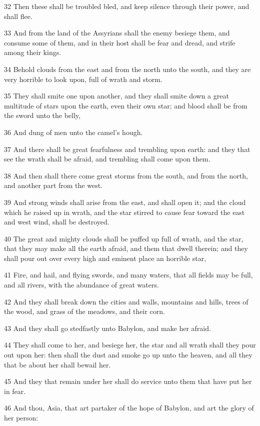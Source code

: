 \par 32 Then these shall be troubled bled, and keep silence through their power, and shall flee.
\par 33 And from the land of the Assyrians shall the enemy besiege them, and consume some of them, and in their host shall be fear and dread, and strife among their kings.
\par 34 Behold clouds from the east and from the north unto the south, and they are very horrible to look upon, full of wrath and storm.
\par 35 They shall smite one upon another, and they shall smite down a great multitude of stars upon the earth, even their own star; and blood shall be from the sword unto the belly,
\par 36 And dung of men unto the camel's hough.
\par 37 And there shall be great fearfulness and trembling upon earth: and they that see the wrath shall be afraid, and trembling shall come upon them.
\par 38 And then shall there come great storms from the south, and from the north, and another part from the west.
\par 39 And strong winds shall arise from the east, and shall open it; and the cloud which he raised up in wrath, and the star stirred to cause fear toward the east and west wind, shall be destroyed.
\par 40 The great and mighty clouds shall be puffed up full of wrath, and the star, that they may make all the earth afraid, and them that dwell therein; and they shall pour out over every high and eminent place an horrible star,
\par 41 Fire, and hail, and flying swords, and many waters, that all fields may be full, and all rivers, with the abundance of great waters.
\par 42 And they shall break down the cities and walls, mountains and hills, trees of the wood, and grass of the meadows, and their corn.
\par 43 And they shall go stedfastly unto Babylon, and make her afraid.
\par 44 They shall come to her, and besiege her, the star and all wrath shall they pour out upon her: then shall the dust and smoke go up unto the heaven, and all they that be about her shall bewail her.
\par 45 And they that remain under her shall do service unto them that have put her in fear.
\par 46 And thou, Asia, that art partaker of the hope of Babylon, and art the glory of her person:
